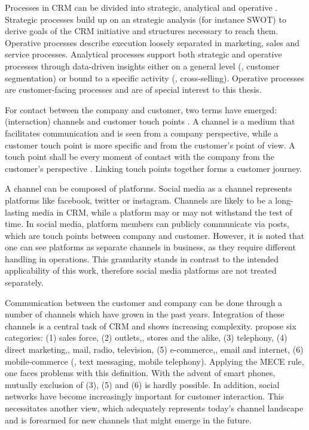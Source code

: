 		
		Processes in CRM can be divided into strategic, analytical and operative \citep{Neckel2005}. Strategic processes build up on an strategic analysis (for instance \acrshort{SWOT}) to derive goals of the CRM initiative and structures necessary to reach them. Operative processes describe execution loosely separated in marketing, sales and service processes. Analytical processes support both strategic and operative processes through data-driven insights either on a general level (\ie, customer segmentation) or bound to a specific activity (\ie, cross-selling). Operative processes are customer-facing processes and are of special interest to this thesis. 
		
		 For contact between the company and customer, two terms have emerged: (interaction) channels and customer touch points \citep{Leuer2011}. A channel is a medium that facilitates communication and is seen from a company perspective, while a customer touch point is more specific and from the customer's point of view. A touch point shall be every moment of contact with the company from the customer's perspective \citep{Zomerdijk_2010}. Linking touch points together forms a customer journey. 
		 
		 A channel can be composed of platforms. Social media as a channel represents platforms like facebook, twitter or instagram. Channels are likely to be a long-lasting media in CRM, while a platform may or may not withstand the test of time. In social media, platform members can publicly communicate via posts, which are touch points between company and customer. 
		 However, it is noted that one can see platforms as separate channels in business, as they require different handling in operations. This granularity stands in contrast to the intended applicability of this work, therefore social media platforms are not treated separately. 
		
		Communication between the customer and company can be done through a number of channels which have grown in the past years. Integration of these channels is a central task of CRM and shows increasing complexity. \cite{paynefrow2005} propose six categories: (1) sales force, (2) outlets,\ie, stores and the alike, (3) telephony, (4) direct marketing,\ie , mail, radio, television, (5) e-commerce,\ie , email and internet, (6) mobile-commerce (\ie, text messaging, mobile telephony). Applying the \acrfull{MECE} rule, one faces problems with this definition. With the advent of smart phones, mutually exclusion of (3), (5) and (6) is hardly possible. In addition, social networks have become increasingly important for customer interaction. This necessitates another view, which adequately represents today's channel landscape and is forearmed for new channels that might emerge in the future. 
		
